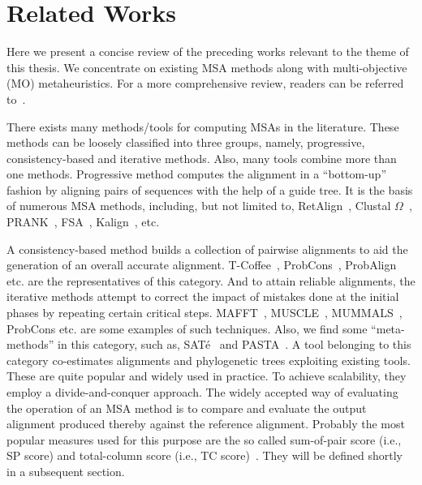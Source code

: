 \section{Related Works}
\label{sec:literature}
Here we present a concise review of the preceding works relevant to the theme of this thesis. We concentrate on existing MSA methods along with multi-objective (MO) metaheuristics. For a more comprehensive review, readers can be referred to~\citep{warnow2017computational}.

There exists many methods/tools for computing MSAs in the literature. These methods can be loosely classified into three groups, namely, progressive, consistency-based and iterative methods. Also, many tools combine more than one methods. Progressive method computes the alignment in a ``bottom-up'' fashion by aligning pairs of sequences with the help of a guide tree. It is the basis of numerous MSA methods, including, but not limited to, RetAlign~\citep{szabo2010reticular}, Clustal $\Omega$~\citep{sievers2011fast}, PRANK~\citep{loytynoja2005algorithm}, FSA~\citep{bradley2009fast},  Kalign~\citep{lassmann2008kalign2}, etc. 



A consistency-based method builds a collection of pairwise alignments to aid the generation of an overall accurate alignment. T-Coffee~\citep{notredame2000t}, ProbCons~\citep{do2005probcons}, ProbAlign~\citep{roshan2006probalign} etc. are the representatives of this category. And to attain reliable alignments, the iterative methods attempt to correct the impact of mistakes done at the initial phases by repeating certain critical steps. MAFFT~\citep{katoh2002mafft}, MUSCLE~\citep{edgar2004muscle}, MUMMALS~\citep{pei2006mummals}, ProbCons etc. are some examples of such techniques. Also, we find some ``meta-methods'' in this category, such as, SAT\'e~\citep{liu2009rapid} and PASTA~\citep{mirarab2015pasta}. A tool belonging to this category  co-estimates alignments and phylogenetic trees exploiting existing tools. These are quite popular and widely used in practice. To achieve scalability, they employ a divide-and-conquer approach. The widely accepted way of evaluating the operation of an MSA method is to compare and evaluate the output alignment produced thereby against the reference alignment. Probably the most popular measures used for this purpose are the so called sum-of-pair score (i.e., SP score) and total-column score (i.e., TC score)~\citep{warnow2017computational}. They will be defined shortly in a subsequent section.


